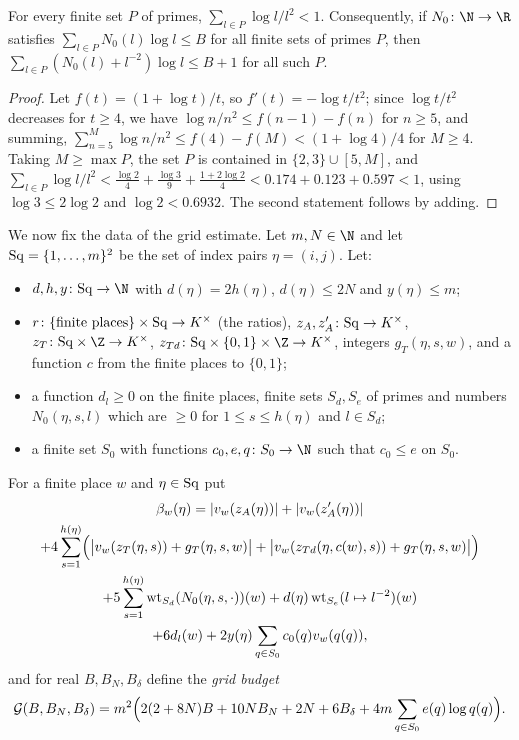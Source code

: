 \begin{lemma}\label{pf:fit:primes}
For every finite set $P$ of primes, $\sum_{l\in P}\log l/l^2<1$. Consequently, if $N_0\colon\N\to\R$ satisfies
$\sum_{l\in P}N_0(l)\log l\le B$ for all finite sets of primes $P$, then
$\sum_{l\in P}(N_0(l)+l^{-2})\log l\le B+1$ for all such $P$.
\end{lemma}

\begin{proof}
Let $f(t)=(1+\log t)/t$, so $f'(t)=-\log t/t^2$; since $\log t/t^2$ decreases for $t\ge4$, we have
$\log n/n^2\le f(n-1)-f(n)$ for $n\ge5$, and summing, $\sum_{n=5}^M\log n/n^2\le f(4)-f(M)<(1+\log4)/4$ for $M\ge4$.
Taking $M\ge\max P$, the set $P$ is contained in $\{2,3\}\cup[5,M]$, and
$\sum_{l\in P}\log l/l^2<\frac{\log2}4+\frac{\log3}9+\frac{1+2\log2}4<0.174+0.123+0.597<1$, using
$\log3\le2\log2$ and $\log2<0.6932$. The second statement follows by adding.
\end{proof}

We now fix the data of the grid estimate. Let $m,N\in\N$ and let $\mathrm{Sq}=\{1,\dots,m\}^2$ be the set of index pairs
$\eta=(i,j)$. Let:
\begin{itemize}
\item $d,h,y\colon\fitSq\to\N$ with $d(\eta)=2h(\eta)$, $d(\eta)\le2N$ and $y(\eta)\le m$;
\item $r\colon\{\text{finite places}\}\times\mathrm{Sq}\to K^\times$ (the ratios), $z_A,z'_A\colon\mathrm{Sq}\to K^\times$,
$z_T\colon\fitSq\times\Z\to K^\times$, $z_{Td}\colon\fitSq\times\{0,1\}\times\Z\to K^\times$, integers
$g_T(\eta,s,w)$, and a function $c$ from the finite places to $\{0,1\}$;
\item a function $d_l\ge0$ on the finite places, finite sets $S_d,S_e$ of primes and numbers $N_0(\eta,s,l)$ which
are $\ge0$ for $1\le s\le h(\eta)$ and $l\in S_d$;
\item a finite set $S_0$ with functions $c_0,e,q\colon S_0\to\N$ such that $c_0\le e$ on $S_0$.
\end{itemize}
For a finite place $w$ and $\eta\in\mathrm{Sq}$ put
\begin{multline}\label{eq:pf:fit:sqbound}
\beta_w(\eta)=|v_w(z_A(\eta))|+|v_w(z'_A(\eta))|\\
+4\sum_{s=1}^{h(\eta)}\Bigl(\bigl|v_w(z_T(\eta,s))+g_T(\eta,s,w)\bigr|
+\bigl|v_w(z_{Td}(\eta,c(w),s))+g_T(\eta,s,w)\bigr|\Bigr)\\
+5\sum_{s=1}^{h(\eta)}\operatorname{wt}_{S_d}(N_0(\eta,s,\cdot))(w)+d(\eta)\operatorname{wt}_{S_e}(l\mapsto l^{-2})(w)\\
+6d_l(w)+2y(\eta)\sum_{q\in S_0}c_0(q)v_w(q(q)),
\end{multline}
and for real $B,B_N,B_\delta$ define the \emph{grid budget}
\begin{equation}\label{eq:pf:fit:budget}
\mathcal{G}(B,B_N,B_\delta)=m^2\Bigl(2(2+8N)B+10NB_N+2N+6B_\delta+4m\sum_{q\in S_0}e(q)\log q(q)\Bigr).
\end{equation}

